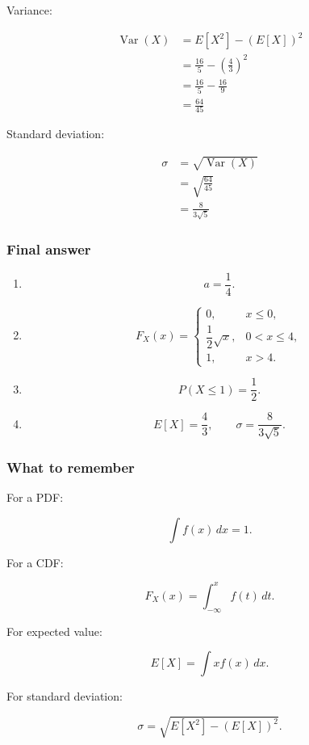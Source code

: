 \documentclass[10pt]{article}
\begin{document}
Variance:

\begin{align*}
\operatorname{Var}(X)
&=
E[X^2]-(E[X])^2 \\[2mm]
&=
\frac{16}{5}
-\left(\frac{4}{3}\right)^2 \\[2mm]
&=
\frac{16}{5}
-\frac{16}{9} \\[2mm]
&=
\frac{64}{45}
\end{align*}

Standard deviation:

\begin{align*}
\sigma
&=
\sqrt{\operatorname{Var}(X)} \\[2mm]
&=
\sqrt{\frac{64}{45}} \\[2mm]
&=
\frac{8}{3\sqrt{5}}
\end{align*}

\subsubsection*{Final answer}
\begin{enumerate}[label=\alph*)]
\item
\[
a=\frac{1}{4}.
\]

\item
\[
F_X(x)=
\begin{cases}
0,
& x\leq 0,\\
\dfrac{1}{2}\sqrt{x},
& 0<x\leq 4,\\
1,
& x>4.
\end{cases}
\]

\item
\[
P(X\leq 1)=\frac{1}{2}.
\]

\item
\[
E[X]=\frac{4}{3},
\qquad
\sigma=\frac{8}{3\sqrt{5}}.
\]
\end{enumerate}

\subsubsection*{What to remember}
For a PDF:

\[
\int f(x)\,dx=1.
\]

For a CDF:

\[
F_X(x)=\int_{-\infty}^{x} f(t)\,dt.
\]

For expected value:

\[
E[X]=\int x f(x)\,dx.
\]

For standard deviation:

\[
\sigma=
\sqrt{E[X^2]-(E[X])^2}.
\]
\end{document}

